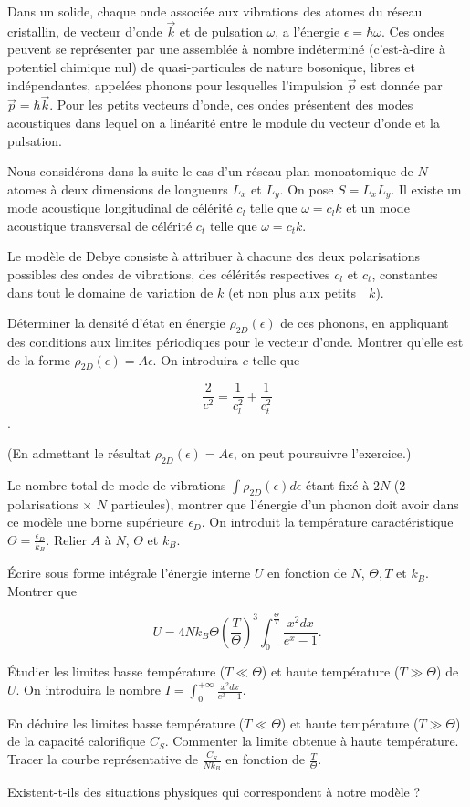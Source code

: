 Dans un solide, chaque onde associée aux vibrations des atomes du réseau cristallin, de vecteur d'onde $\Vec{k}$ et de pulsation $\omega$, a l'énergie $\epsilon= \hbar \omega$. Ces ondes peuvent se représenter par une assemblée à nombre indéterminé (c'est-à-dire à potentiel chimique nul) de quasi-particules de nature bosonique, libres et indépendantes, appelées phonons pour lesquelles l'impulsion $\Vec{p}$ est donnée par $\Vec{p}=\hbar \Vec{k}$. Pour les petits vecteurs d'onde, ces ondes présentent des modes acoustiques dans lequel on a linéarité entre le module du vecteur d'onde et la pulsation. 

Nous considérons dans la suite le cas d'un réseau plan monoatomique de $N$ atomes à deux dimensions de longueurs $L_x$ et $L_y$. On pose $S=L_x L_y$. Il existe un mode acoustique longitudinal de célérité $c_l$ telle que $\omega = c_l k $ et un mode acoustique transversal de célérité $c_t$ telle que $\omega = c_t k $.

Le modèle de Debye consiste à attribuer à chacune des deux polarisations possibles des ondes de vibrations, des célérités respectives $c_l$ et $c_t$, constantes dans tout le domaine de variation de $k$ (et non plus aux \mbox{\og petits \fg \  $k$}). 

\question  Déterminer la densité d'état en énergie $\rho_{2D}(\epsilon)$ de ces phonons, en appliquant des conditions aux limites périodiques pour le vecteur d'onde. Montrer qu'elle est de la forme $\rho_{2D}(\epsilon)=A \epsilon$. On introduira $c$ telle que

$$\frac{2}{c^2}=\frac{1}{c_l^2}+\frac{1}{c_t^2}$$.

(En admettant le résultat $\rho_{2D}(\epsilon)=A \epsilon$, on peut poursuivre l'exercice.)

\question Le nombre total de mode de vibrations $\int \rho_{2D}(\epsilon) d\epsilon$ étant fixé à $2 N$ (2 polarisations  $\times$ $N$ particules), montrer que l'énergie d'un phonon doit avoir dans ce modèle une borne supérieure $\epsilon_D$. On introduit la température caractéristique $\Theta=\frac{\epsilon_D}{k_B}$. Relier $A$ à $N$, $\Theta$ et $k_B$.

\question \'Ecrire sous forme intégrale l'énergie interne $U$ en fonction de $N$, $\Theta, T$ et $k_B$.  Montrer que

$$U=4 N k_B \Theta \left( \frac{T}{\Theta} \right)^3  \int_0^{\frac{\Theta}{T}} \frac{x^2 dx}{e^x-1}.$$

\question \'Etudier les limites basse température ($T \ll \Theta$) et haute température ($T \gg \Theta$) de $U$. On introduira le nombre $I=\int_0^{+\infty} \frac{x^2 dx}{e^x-1}$.
 

\question En déduire les limites basse température ($T \ll \Theta$) et haute température ($T \gg \Theta$) de la capacité calorifique $C_S$. Commenter la limite obtenue à haute température. Tracer la courbe représentative de $\frac{C_S}{N k_B}$ en fonction de $\frac{T}{\Theta}$.

\question Existent-t-ils des situations physiques qui correspondent à notre modèle ?
